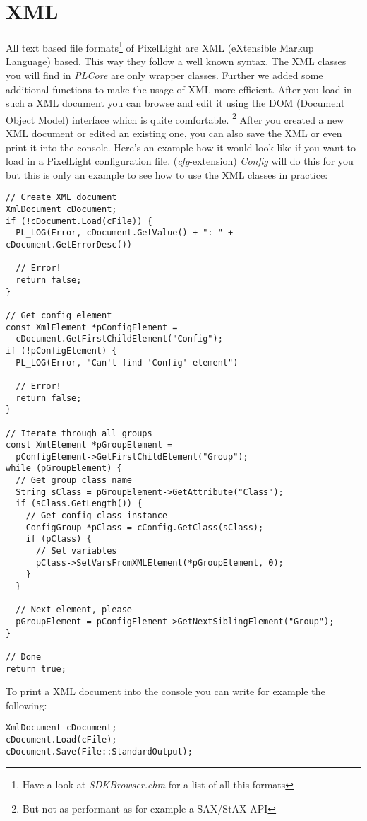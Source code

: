 \section{XML}
All text based file formats\footnote{Have a look at \emph{SDKBrowser.chm} for a list of all this formats} of PixelLight are XML (eXtensible Markup Language) based. This way they follow a well known syntax. The XML classes you will find in \emph{PLCore} are only wrapper classes. Further we added some additional functions to make the usage of XML more efficient. After you load in such a XML document you can browse and edit it using the DOM (Document Object Model) interface which is quite comfortable. \footnote{But not as performant as for example a SAX/StAX API} After you created a new XML document or edited an existing one, you can also save the XML or even print it into the console. Here's an example how it would look like if you want to load in a PixelLight configuration file. (\emph{cfg}-extension) \emph{Config} will do this for you but this is only an example to see how to use the XML classes in practice:

\begin{lstlisting}[caption=XML DOM usage example]
// Create XML document
XmlDocument cDocument;
if (!cDocument.Load(cFile)) {
  PL_LOG(Error, cDocument.GetValue() + ": " + cDocument.GetErrorDesc())

  // Error!
  return false;
}

// Get config element
const XmlElement *pConfigElement =
  cDocument.GetFirstChildElement("Config");
if (!pConfigElement) {
  PL_LOG(Error, "Can't find 'Config' element")

  // Error!
  return false;
}

// Iterate through all groups
const XmlElement *pGroupElement =
  pConfigElement->GetFirstChildElement("Group");
while (pGroupElement) {
  // Get group class name
  String sClass = pGroupElement->GetAttribute("Class");
  if (sClass.GetLength()) {
    // Get config class instance
    ConfigGroup *pClass = cConfig.GetClass(sClass);
    if (pClass) {
      // Set variables
      pClass->SetVarsFromXMLElement(*pGroupElement, 0);
    }
  }

  // Next element, please
  pGroupElement = pConfigElement->GetNextSiblingElement("Group");
}

// Done
return true;
\end{lstlisting}

To print a XML document into the console you can write for example the following:

\begin{lstlisting}[caption=Print XML document into the console]
XmlDocument cDocument;
cDocument.Load(cFile);
cDocument.Save(File::StandardOutput);
\end{lstlisting}

